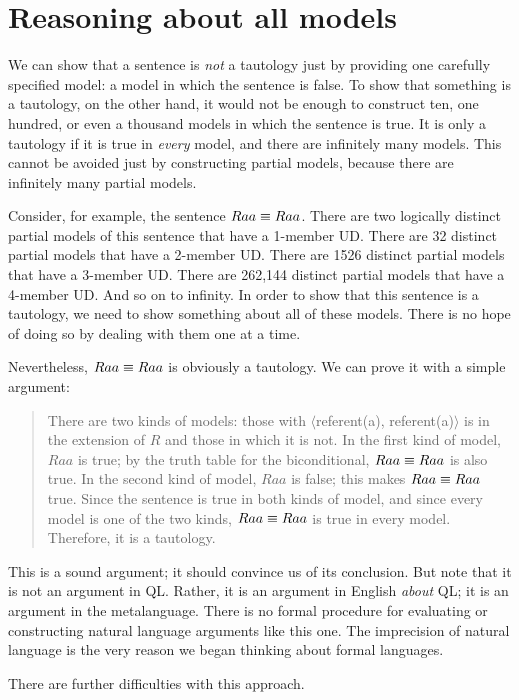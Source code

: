 \section{Reasoning about all models}
\label{sec.allmodelreasoning}
We can show that a sentence is \emph{not} a tautology just by providing one carefully specified model: a model in which the sentence is false. To show that something is a tautology, on the other hand, it would not be enough to construct ten, one hundred, or even a thousand models in which the sentence is true. It is only a tautology if it is true in \emph{every} model, and there are infinitely many models. This cannot be avoided just by constructing partial models, because there are infinitely many partial models.

Consider, for example, the sentence $Raa\equiv Raa$. There are two logically distinct partial models of this sentence that have a 1-member UD. There are 32 distinct partial models that have a 2-member UD. There are 1526 distinct partial models that have a 3-member UD. There are 262,144 distinct partial models that have a 4-member UD. And so on to infinity. In order to show that this sentence is a tautology, we need to show something about all of these models. There is no hope of doing so by dealing with them one at a time.

Nevertheless, $Raa\equiv Raa$ is obviously a tautology. We can prove it with a simple argument:
\begin{quote}
\label{allmodels1}
There are two kinds of models: those with $\langle$referent(a), referent(a)$\rangle$ is in the extension of $R$ and those in which it is not. In the first kind of model, $Raa$ is true; by the truth table for the biconditional, $Raa\equiv Raa$ is also true. In the second kind of model, $Raa$ is false; this makes $Raa\equiv Raa$ true. Since the sentence is true in both kinds of model, and since every model is one of the two kinds, $Raa\equiv Raa$ is true in every model. Therefore, it is a tautology.
\end{quote}
This is a sound argument; it should convince us of its conclusion. But note that it is not an argument in QL. Rather, it is an argument in English \emph{about} QL; it is an argument in the metalanguage. There is no formal procedure for evaluating or constructing natural language arguments like this one. The imprecision of natural language is the very reason we began thinking about formal languages.

There are further difficulties with this approach.

